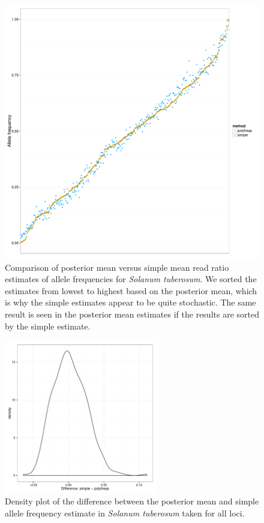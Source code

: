 \documentclass[]{article}
\begin{document}
\begin{figure}[b]
\centering
\includegraphics[width=\textwidth]{pdf/figS2}
\caption{Comparison of posterior mean versus simple mean read ratio estimates of allele frequencies for \textit{Solanum tuberosum}. We sorted the estimates from lowest to highest based on the posterior mean, which is why the simple estimates appear to be quite stochastic. The same result is seen in the posterior mean estimates if the results are sorted by the simple estimate.}
\end{figure}



\begin{figure}[b]
\centering
\includegraphics[width=0.6\textwidth]{pdf/figS3}
\caption{Density plot of the difference between the posterior mean and simple allele frequency estimate in \textit{Solanum tuberosum} taken for all loci.}
\end{figure}
\end{document}
